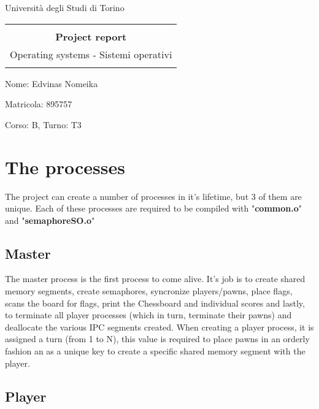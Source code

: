 \documentclass[11pt]{article}
\begin{document}
\thispagestyle{empty}

\begin{center}
	\Large{Università degli Studi di Torino}
\end{center}



\begin{center}	
	\begin{tabular}{c}	
		\\ \hline
		\\
		\huge{\textbf{Project report}}
		\\
		\footnotesize{Operating systems - Sistemi operativi}
		\\
		\\ \hline
	\end{tabular}
	
	\bigskip
	
Nome: Edvinas Nomeika	

Matricola: 895757

\footnotesize{Corso: B, Turno: T3}
	
\end{center}
\pagebreak
\tableofcontents
\pagebreak

\section{The processes}

The project can create a number of processes in it's lifetime, but 3 of them are unique. Each of these processes are required to be compiled with "\textbf{common.o}" and "\textbf{semaphoreSO.o}"

\subsection{Master}

The master process is the first process to come alive. It's job is to create shared memory segments, create semaphores, syncronize players/pawns, place flags, scans the board for flags, print the Chessboard and individual scores and lastly, to terminate all player processes (which in turn, terminate their pawns) and deallocate the various IPC segments created. When creating a player process, it is assigned a turn (from 1 to N), this value is required to place pawns in an orderly fashion an as a unique key to create a specific shared memory segment with the player.

\subsection{Player}
\end{document}

